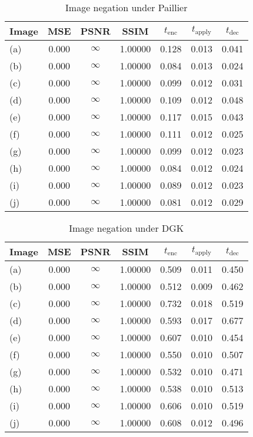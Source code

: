 \begin{table}[t]
	\centering
	\caption{Image negation under Paillier}
	\label{tbl:neg-pal}
    \begin{tabular}{lcccccc}
        \hline
        Image & MSE  & PSNR & SSIM & $t_\text{enc}$ & $t_\text{apply}$ & $t_\text{dec}$ \\ \hline
        (a) & 0.000 & $\infty$ & 1.00000 & 0.128 & 0.013 & 0.041 \\
		(b) & 0.000 & $\infty$ & 1.00000 & 0.084 & 0.013 & 0.024 \\
		(c) & 0.000 & $\infty$ & 1.00000 & 0.099 & 0.012 & 0.031 \\
		(d) & 0.000 & $\infty$ & 1.00000 & 0.109 & 0.012 & 0.048 \\
		(e) & 0.000 & $\infty$ & 1.00000 & 0.117 & 0.015 & 0.043 \\
		(f) & 0.000 & $\infty$ & 1.00000 & 0.111 & 0.012 & 0.025 \\
		(g) & 0.000 & $\infty$ & 1.00000 & 0.099 & 0.012 & 0.023 \\
		(h) & 0.000 & $\infty$ & 1.00000 & 0.084 & 0.012 & 0.024 \\
		(i) & 0.000 & $\infty$ & 1.00000 & 0.089 & 0.012 & 0.023 \\
		(j) & 0.000 & $\infty$ & 1.00000 & 0.081 & 0.012 & 0.029 \\
		\hline
    \end{tabular}
\end{table}

\begin{table}[t]
	\centering
	\caption{Image negation under DGK}
	\label{tbl:neg-dgk}
    \begin{tabular}{lcccccc}
        \hline
        Image & MSE  & PSNR & SSIM & $t_\text{enc}$ & $t_\text{apply}$ & $t_\text{dec}$ \\ \hline
		(a) & 0.000 & $\infty$ & 1.00000 & 0.509 & 0.011 & 0.450 \\
		(b) & 0.000 & $\infty$ & 1.00000 & 0.512 & 0.009 & 0.462 \\
		(c) & 0.000 & $\infty$ & 1.00000 & 0.732 & 0.018 & 0.519 \\
		(d) & 0.000 & $\infty$ & 1.00000 & 0.593 & 0.017 & 0.677 \\
		(e) & 0.000 & $\infty$ & 1.00000 & 0.607 & 0.010 & 0.454 \\
		(f) & 0.000 & $\infty$ & 1.00000 & 0.550 & 0.010 & 0.507 \\
		(g) & 0.000 & $\infty$ & 1.00000 & 0.532 & 0.010 & 0.471 \\
		(h) & 0.000 & $\infty$ & 1.00000 & 0.538 & 0.010 & 0.513 \\
		(i) & 0.000 & $\infty$ & 1.00000 & 0.606 & 0.010 & 0.519 \\
		(j) & 0.000 & $\infty$ & 1.00000 & 0.608 & 0.012 & 0.496 \\
		\hline
        \end{tabular}
\end{table}

